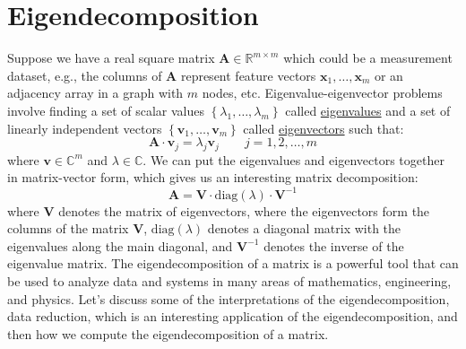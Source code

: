 \documentclass{article}[11pt]
\begin{document}
\section{Eigendecomposition}
Suppose we have a real square matrix $\mathbf{A}\in\mathbb{R}^{m\times{m}}$ which could be a measurement dataset, e.g., the columns of $\mathbf{A}$ represent feature 
vectors $\mathbf{x}_{1},\dots,\mathbf{x}_{m}$ or an adjacency array in a graph with $m$ nodes, etc. Eigenvalue-eigenvector problems involve finding a set of scalar values $\left\{\lambda_{1},\dots,\lambda_{m}\right\}$ called 
\href{https://mathworld.wolfram.com/Eigenvalue.html}{eigenvalues} and a set of linearly independent vectors 
$\left\{\mathbf{v}_{1},\dots,\mathbf{v}_{m}\right\}$ called \href{https://mathworld.wolfram.com/Eigenvector.html}{eigenvectors} such that:
\begin{equation}
\mathbf{A}\cdot\mathbf{v}_{j} = \lambda_{j}\mathbf{v}_{j}\qquad{j=1,2,\dots,m}
\end{equation}
where $\mathbf{v}\in\mathbb{C}^{m}$ and $\lambda\in\mathbb{C}$. We can put the eigenvalues and eigenvectors together in matrix-vector form, which gives us an interesting matrix decomposition:
\begin{equation}
\mathbf{A} = \mathbf{V}\cdot\text{diag}(\lambda)\cdot\mathbf{V}^{-1}
\end{equation}
where $\mathbf{V}$ denotes the matrix of eigenvectors, where the eigenvectors form the columns of the matrix $\mathbf{V}$, $\text{diag}(\lambda)$ denotes a diagonal matrix with the eigenvalues along the main diagonal, 
and $\mathbf{V}^{-1}$ denotes the inverse of the eigenvalue matrix.
The eigendecomposition of a matrix is a powerful tool that can be used to analyze data and systems in many areas of mathematics, engineering, and physics.
Let's discuss some of the interpretations of the eigendecomposition, data reduction, which is an interesting application of the eigendecomposition, and then how we compute the eigendecomposition of a matrix.
\end{document}
